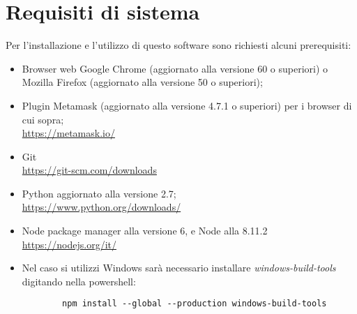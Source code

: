 \section{Requisiti di sistema}
Per l'installazione e l'utilizzo di questo software sono richiesti alcuni prerequisiti:
\begin{itemize}
	\item Browser web Google Chrome (aggiornato alla versione 60 o superiori) o Mozilla Firefox (aggiornato alla versione 50 o superiori);
	\item Plugin Metamask (aggiornato alla versione 4.7.1 o superiori) per i browser di cui sopra; \\
	\url{https://metamask.io/}
	\item Git \\
	\url{https://git-scm.com/downloads}
	\item Python aggiornato alla versione 2.7; \\
	\url{https://www.python.org/downloads/}
	\item Node package manager alla versione 6, e Node alla 8.11.2 \\
	\url{https://nodejs.org/it/}
	\item Nel caso si utilizzi Windows sarà necessario installare \textit{windows-build-tools} digitando nella powershell: 
	\begin{lstlisting}
		npm install --global --production windows-build-tools
	\end{lstlisting}

	 
\end{itemize}